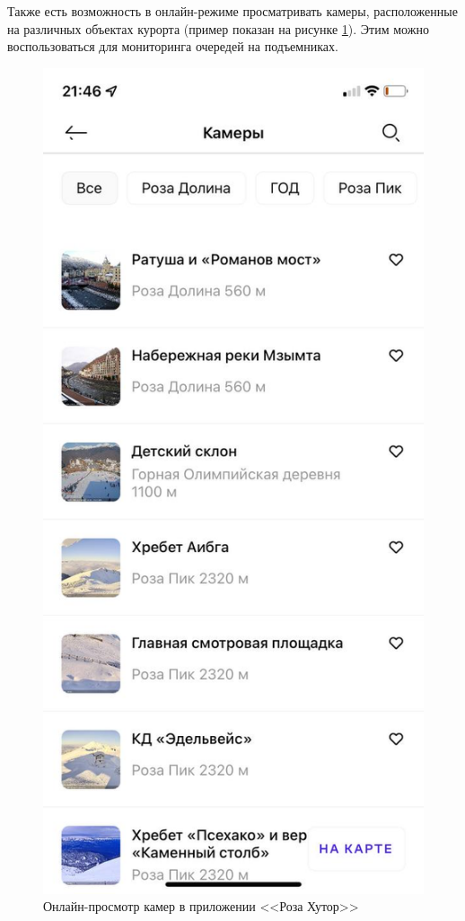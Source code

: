 \clearpage
Также есть возможность в онлайн-режиме просматривать камеры, расположенные на различных объектах курорта (пример показан на рисунке \ref{img:rcamera1}). Этим можно воспользоваться для мониторинга очередей на подъемниках.


\begin{figure}[h!]
	\begin{center}
		\includegraphics[scale=0.4]{../imgs/analogue_apps/rcamera1.png}
	\end{center}
	\captionsetup{justification=centering}
	\caption{Онлайн-просмотр камер в приложении <<Роза Хутор>>}
	\label{img:rcamera1}
\end{figure}



